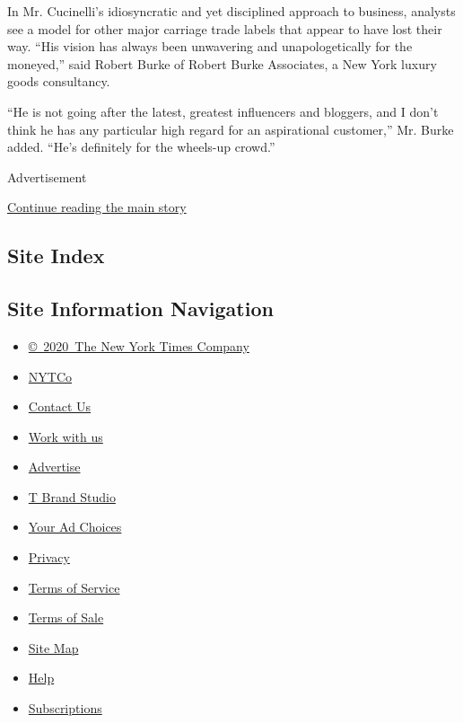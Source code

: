 In Mr. Cucinelli's idiosyncratic and yet disciplined approach to
business, analysts see a model for other major carriage trade labels
that appear to have lost their way. ``His vision has always been
unwavering and unapologetically for the moneyed,'' said Robert Burke of
Robert Burke Associates, a New York luxury goods consultancy.

``He is not going after the latest, greatest influencers and bloggers,
and I don't think he has any particular high regard for an aspirational
customer,'' Mr. Burke added. ``He's definitely for the wheels-up
crowd.''

Advertisement

\protect\hyperlink{after-bottom}{Continue reading the main story}

\hypertarget{site-index}{%
\subsection{Site Index}\label{site-index}}

\hypertarget{site-information-navigation}{%
\subsection{Site Information
Navigation}\label{site-information-navigation}}

\begin{itemize}
\tightlist
\item
  \href{https://help.nytimes3xbfgragh.onion/hc/en-us/articles/115014792127-Copyright-notice}{©~2020~The
  New York Times Company}
\end{itemize}

\begin{itemize}
\tightlist
\item
  \href{https://www.nytco.com/}{NYTCo}
\item
  \href{https://help.nytimes3xbfgragh.onion/hc/en-us/articles/115015385887-Contact-Us}{Contact
  Us}
\item
  \href{https://www.nytco.com/careers/}{Work with us}
\item
  \href{https://nytmediakit.com/}{Advertise}
\item
  \href{http://www.tbrandstudio.com/}{T Brand Studio}
\item
  \href{https://www.nytimes3xbfgragh.onion/privacy/cookie-policy\#how-do-i-manage-trackers}{Your
  Ad Choices}
\item
  \href{https://www.nytimes3xbfgragh.onion/privacy}{Privacy}
\item
  \href{https://help.nytimes3xbfgragh.onion/hc/en-us/articles/115014893428-Terms-of-service}{Terms
  of Service}
\item
  \href{https://help.nytimes3xbfgragh.onion/hc/en-us/articles/115014893968-Terms-of-sale}{Terms
  of Sale}
\item
  \href{https://spiderbites.nytimes3xbfgragh.onion}{Site Map}
\item
  \href{https://help.nytimes3xbfgragh.onion/hc/en-us}{Help}
\item
  \href{https://www.nytimes3xbfgragh.onion/subscription?campaignId=37WXW}{Subscriptions}
\end{itemize}
